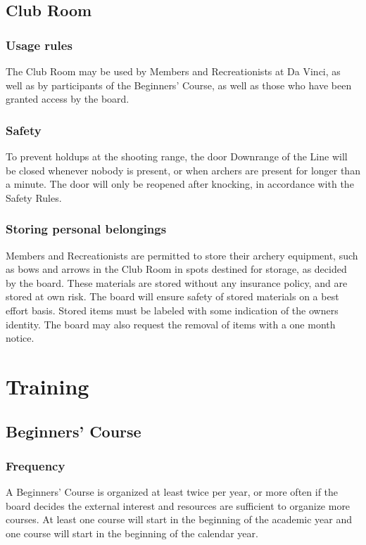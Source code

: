 \documentclass[a4paper]{article}
\newcommand{\Asr}{Safety Rules} %
\begin{document}
\subsection{Club Room}
\subsubsection{Usage rules}
The Club Room may be used by Members and Recreationists at Da Vinci, as well as by participants of the Beginners' Course, as well as those who have been granted access by the board. 

\subsubsection{Safety}
To prevent holdups at the shooting range, the door Downrange of the Line will be closed whenever nobody is present, or when archers are present for longer than a minute. The door will only be reopened after knocking, in accordance with the \Asr .

\subsubsection{Storing personal belongings}
Members and Recreationists are permitted to store their archery equipment, such as bows and arrows in the Club Room in spots destined for storage, as decided by the board. These materials are stored without any insurance policy, and are stored at own risk. The board will ensure safety of stored materials on a best effort basis. Stored items must be labeled with some indication of the owners identity. The board may also request the removal of items with a one month notice.


\section{Training}
\subsection{Beginners' Course}
\subsubsection{Frequency}
A Beginners' Course is organized at least twice per year, or more often if the board decides the external interest and resources are sufficient to organize more courses. At least one course will start in the beginning of the academic year and one course will start in the beginning of the calendar year.
\end{document}
